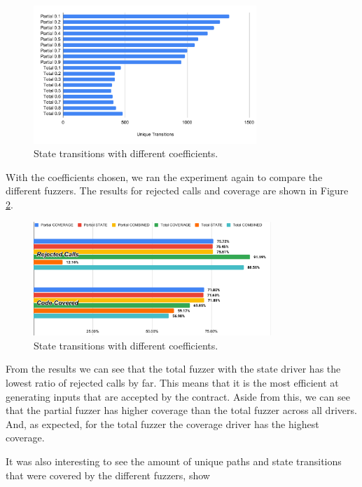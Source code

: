 \begin{figure}[htbp]
    \centering
    \includegraphics[width=0.75\textwidth]{charts/coef-trans.pdf}
    \caption{State transitions with different coefficients.}\label{fig:coef-trans}
\end{figure}

With the coefficients chosen, we ran the experiment again to compare the different fuzzers.
The results for rejected calls and coverage are shown in Figure \ref{fig:rej-cov}.

\begin{figure}[htbp]
    \centering
    \includegraphics[width=0.8\textwidth]{charts/rej-cov.pdf}
    \caption{State transitions with different coefficients.}\label{fig:rej-cov}
\end{figure}

From the results we can see that the total fuzzer with the state driver has the lowest ratio of rejected calls by far.
This means that it is the most efficient at generating inputs that are accepted by the contract.
Aside from this, we can see that the partial fuzzer has higher coverage than the total fuzzer across all drivers.
And, as expected, for the total fuzzer the coverage driver has the highest coverage.

It was also interesting to see the amount of unique paths and state transitions that were covered by the different fuzzers, show



